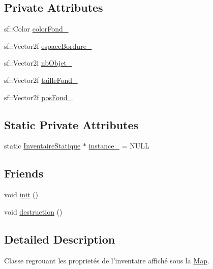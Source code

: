 \subsection*{Private Attributes}
\begin{DoxyCompactItemize}
\item 
sf\-::\-Color \hyperlink{classPropriete_1_1InventaireStatique_a680f476ab599ac403bfaf073492b6352}{color\-Fond\-\_\-}
\item 
sf\-::\-Vector2f \hyperlink{classPropriete_1_1InventaireStatique_a1b0e23a2f44408b24264d69879a4bd0e}{espace\-Bordure\-\_\-}
\item 
sf\-::\-Vector2i \hyperlink{classPropriete_1_1InventaireStatique_a39b5442b56892675cd57ebc8d1cabe55}{nb\-Objet\-\_\-}
\item 
sf\-::\-Vector2f \hyperlink{classPropriete_1_1InventaireStatique_ae3f1b7ce5a1b0027c8015d65bde893b9}{taille\-Fond\-\_\-}
\item 
sf\-::\-Vector2f \hyperlink{classPropriete_1_1InventaireStatique_aa87cc7023c837e29cec3961912484fe5}{pos\-Fond\-\_\-}
\end{DoxyCompactItemize}
\subsection*{Static Private Attributes}
\begin{DoxyCompactItemize}
\item 
static \hyperlink{classPropriete_1_1InventaireStatique}{Inventaire\-Statique} $\ast$ \hyperlink{classPropriete_1_1InventaireStatique_aa8124e05ce1eab26952cbda3526664be}{instance\-\_\-} = N\-U\-L\-L
\end{DoxyCompactItemize}
\subsection*{Friends}
\begin{DoxyCompactItemize}
\item 
void \hyperlink{classPropriete_1_1InventaireStatique_a02fd73d861ef2e4aabb38c0c9ff82947}{init} ()
\item 
void \hyperlink{classPropriete_1_1InventaireStatique_a79af67d84b6605d4aa37501ecd923146}{destruction} ()
\end{DoxyCompactItemize}


\subsection{Detailed Description}
Classe regrouant les proprietés de l'inventaire affiché sous la \hyperlink{classMap}{Map}. 

